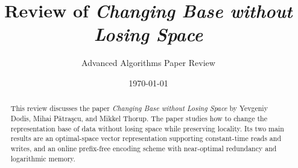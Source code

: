 \documentclass[12pt]{article}
\title{
    Review of \textit{Changing Base without Losing Space}
}
\author{
    Advanced Algorithms Paper Review
}
\date{\today}
\begin{document}
\maketitle

\begin{abstract}
This review discusses the paper \textit{Changing Base without Losing Space} by Yevgeniy Dodis, Mihai P\u{a}tra\c{s}cu, and Mikkel Thorup. The paper studies how to change the representation base of data without losing space while preserving locality. Its two main results are an optimal-space vector representation supporting constant-time reads and writes, and an online prefix-free encoding scheme with near-optimal redundancy and logarithmic memory.
\end{abstract}


\tableofcontents

\newpage
















\end{document}
